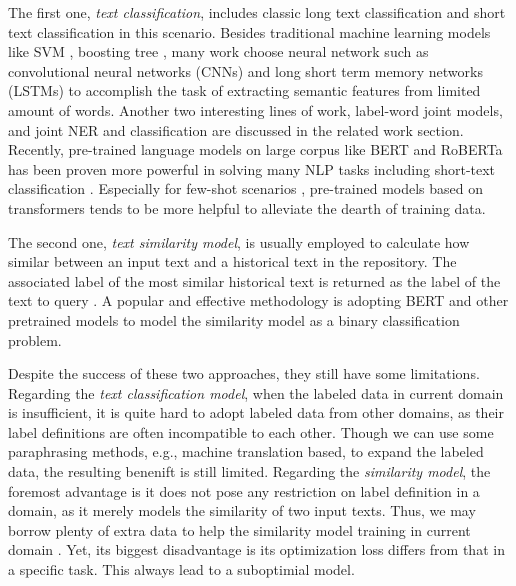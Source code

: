 The   first   one,   \emph{text  classification},  includes  classic  long  text
classification   and   short  text  classification  in  this  scenario.  Besides
traditional  machine  learning models like SVM \cite{suykens1999least}, boosting
tree  \cite{tu2005probabilistic},  many work \cite{wen2016network} choose neural
network      such      as      convolutional      neural     networks     (CNNs)
\cite{kim2014convolutional,zhang2015character,conneau2016very}  and  long  short
term  memory  networks  (LSTMs)  \cite{mousa2017contextual,liu2016recurrent}  to
accomplish  the  task  of  extracting  semantic  features from limited amount of
words.  Another two interesting lines of work, label-word
joint models, and joint NER and classification are discussed in the related work
section.  Recently,  pre-trained  language  models  on  large  corpus  like BERT
\cite{devlin2018bert}  and  RoBERTa  \cite{liu2019roberta}  has been proven more
powerful   in   solving  many  NLP  tasks  including  short-text  classification
\cite{madabushi2020cost}.       Especially      for      few-shot      scenarios
\cite{yu2018diverse},     pre-trained     models     based    on    transformers
\cite{vaswani2017attention}  tends to be more helpful to alleviate the dearth of
training data.

The  second  one, \emph{text similarity model}, is usually employed to calculate
how  similar  between an input text and a historical text in the repository. The
associated label of the most similar historical text is returned as the label of
the  text  to  query \cite{jafarpour2010filter,   leuski2011npceditor}.  
A  popular  and  effective  methodology  is adopting BERT
\cite{devlin2018bert} and other pretrained models \cite{liu2019roberta} to model
the similarity model as a binary classification problem.

Despite  the  success  of  these two approaches, they still have some
limitations.  
Regarding  the  \emph{text  classification  model}, when the labeled data in current
domain  is  insufficient,  it  is  quite  hard  to adopt labeled data from other
domains, as their label definitions are often incompatible to each other. Though
we can use some paraphrasing methods, e.g., machine translation based, to expand
the labeled data, the resulting benenift is still limited.
Regarding the  \emph{similarity model}, the foremost advantage is it does not pose
any restriction on label definition in a domain, as it merely models the
similarity of two input texts. Thus, we may borrow plenty of extra data to help
the similarity model training in current domain \cite{sun2019fine}. 
Yet, its biggest disadvantage is its optimization loss differs from that in a
specific task. This always lead to a suboptimial model.  

